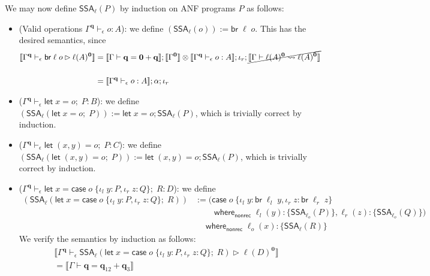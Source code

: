 \documentclass[acmsmall,screen,review]{acmart}
\newcommand{\mb}[1]{\ensuremath{\mathbf{#1}}}
\newcommand{\ms}[1]{\ensuremath{\mathsf{#1}}}
\newcommand{\lto}{:}
\newcommand{\linl}[1]{\iota_l\;{#1}}
\newcommand{\linr}[1]{\iota_r\;{#1}}
\newcommand{\letexpr}[3]{\ensuremath{\ms{let}\;#1 = #2;\;#3}}
\newcommand{\caseexpr}[5]{\ms{case}\;#1\;\{\linl{#2} \lto #3, \linr{#4} \lto #5\}}
\newcommand{\letstmt}[3]{\ensuremath{\ms{let}\;#1 = #2; #3}}
\newcommand{\brb}[2]{\ms{br}\;#1\;#2}
\newcommand{\casestmt}[5]{\ms{case}\;#1\;\{\linl{#2} \lto #3, \linr{#4} \lto #5\}}
\newcommand{\awhere}[2]{#1\;\ms{where}_{\ms{nonrec}}\;#2}
\newcommand{\wbranch}[3]{#1(#2) \lto \{#3\}}
\newcommand{\qsp}[4]{#1 \vdash #2 = #3 + #4}
\newcommand{\lwk}[3]{#1 \vdash #2 \rightsquigarrow #3}
\newcommand{\hasty}[4]{#1 \vdash_{#2} #3: {#4}}
\newcommand{\haslb}[4]{#1 \vdash_{#2} #3 \rhd #4}
\newcommand{\tossa}[2]{\ms{SSA}_{#1}(#2)}
\newcommand{\dnt}[1]{\llbracket{#1}\rrbracket}
\begin{document}
We may now define $\tossa{\ell}{P}$ by induction on ANF programs $P$ as follows:
\begin{itemize}
  \item (Valid operations $\hasty{\Gamma^{\mb{q}}}{\epsilon}{o}{A}$): we define
  $(\tossa{\ell}{o}) := \brb{\ell}{o}$. This has the desired semantics, since
  \begin{align*}
    \dnt{\haslb{\Gamma^{\mb{q}}}{\epsilon}{\brb{\ell}{o}}{\ell(A)^{\mb{0}}}}
    & = \dnt{\qsp{\Gamma}{\mb{q}}{\mb{0}}{\mb{q}}} 
      ; \dnt{\Gamma^{\mb{0}}} \otimes \dnt{\hasty{\Gamma^{\mb{q}}}{\epsilon}{o}{A}} 
      ; \iota_r
      ; \cancel{\dnt{\lwk{\Gamma}{\ell(A)^{\mb{0}}}{\ell(A)^{\mb{0}}}}} \\ 
      \\
    & = \dnt{\hasty{\Gamma^{\mb{q}}}{\epsilon}{o}{A}} 
      ; \alpha
      ; \iota_r
  \end{align*}
  \item ($\hasty{\Gamma^{\mb{q}}}{\epsilon}{\letexpr{x}{o}{P}}{B}$): we define
  $(\tossa{\ell}{\letexpr{x}{o}{P}}) := \letstmt{x}{o}{\tossa{\ell}{P}}$, which is trivially correct
  by induction.
  \item ($\hasty{\Gamma^{\mb{q}}}{\epsilon}{\letexpr{(x, y)}{o}{P}}{C}$): we define
  $(\tossa{\ell}{\letexpr{(x, y)}{o}{P}}) := \letstmt{(x, y)}{o}{\tossa{\ell}{P}}$, which is
  trivially correct by induction.
  \item ($\hasty{\Gamma^{\mb{q}}}{\epsilon}{\letexpr{x}{\caseexpr{o}{y}{P}{z}{Q}}{R}}{D}$): we
  define
  \begin{align*}
    (\tossa{\ell}{\letexpr{x}{\caseexpr{o}{y}{P}{z}{Q}}{R}})
    & := \awhere{(\awhere{\casestmt{o}{y}{\brb{\ell_l}{y}}{z}{\brb{\ell_r}{z}} \\ & \qquad }{
      \wbranch{\ell_l}{y}{\tossa{\ell_o}{P}},
      \wbranch{\ell_r}{z}{\tossa{\ell_o}{Q}})
    } \\ & \quad }{
      \wbranch{\ell_o}{x}{\tossa{\ell}{R}}
    }
  \end{align*}
  We verify the semantics by induction as follows:
  \begin{align*}
    & \dnt{
      \haslb{\Gamma^{\mb{q}}}{\epsilon}{\tossa{\ell}{\letexpr{x}{\caseexpr{o}{y}{P}{z}{Q}}{R}}}
      {\ell(D)^{\mb{0}}}
    } \\
    & = \dnt{\qsp{\Gamma}{\mb{q}}{\mb{q}_{12}}{\mb{q}_3}} 

\end{align*}
\end{itemize}
\end{document}
